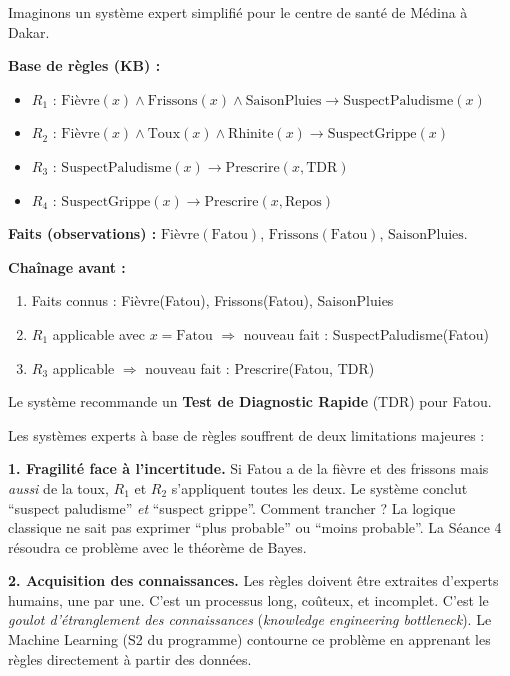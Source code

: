 \documentclass[11pt,a4paper]{article}
\begin{document}
\begin{exemplebox}
Imaginons un système expert simplifié pour le centre de santé de Médina à Dakar.

\textbf{Base de règles (KB) :}
\begin{itemize}[nosep]
    \item $R_1$ : $\text{Fièvre}(x) \land \text{Frissons}(x) \land \text{SaisonPluies} \rightarrow \text{SuspectPaludisme}(x)$
    \item $R_2$ : $\text{Fièvre}(x) \land \text{Toux}(x) \land \text{Rhinite}(x) \rightarrow \text{SuspectGrippe}(x)$
    \item $R_3$ : $\text{SuspectPaludisme}(x) \rightarrow \text{Prescrire}(x, \text{TDR})$
    \item $R_4$ : $\text{SuspectGrippe}(x) \rightarrow \text{Prescrire}(x, \text{Repos})$
\end{itemize}

\textbf{Faits (observations) :} $\text{Fièvre}(\text{Fatou})$, $\text{Frissons}(\text{Fatou})$, $\text{SaisonPluies}$.

\textbf{Chaînage avant :}
\begin{enumerate}[nosep]
    \item Faits connus : Fièvre(Fatou), Frissons(Fatou), SaisonPluies
    \item $R_1$ applicable avec $x = \text{Fatou}$ $\Rightarrow$ nouveau fait : SuspectPaludisme(Fatou)
    \item $R_3$ applicable $\Rightarrow$ nouveau fait : Prescrire(Fatou, TDR)
\end{enumerate}

Le système recommande un \textbf{Test de Diagnostic Rapide} (TDR) pour Fatou.
\end{exemplebox}

\begin{attentionbox}
Les systèmes experts à base de règles souffrent de deux limitations majeures :

\textbf{1. Fragilité face à l'incertitude.} Si Fatou a de la fièvre et des frissons mais \textit{aussi} de la toux, $R_1$ et $R_2$ s'appliquent toutes les deux. Le système conclut ``suspect paludisme'' \textit{et} ``suspect grippe''. Comment trancher ? La logique classique ne sait pas exprimer ``plus probable'' ou ``moins probable''. La Séance 4 résoudra ce problème avec le théorème de Bayes.

\textbf{2. Acquisition des connaissances.} Les règles doivent être extraites d'experts humains, une par une. C'est un processus long, coûteux, et incomplet. C'est le \textit{goulot d'étranglement des connaissances} (\textit{knowledge engineering bottleneck}). Le Machine Learning (S2 du programme) contourne ce problème en apprenant les règles directement à partir des données.
\end{attentionbox}
\end{document}
